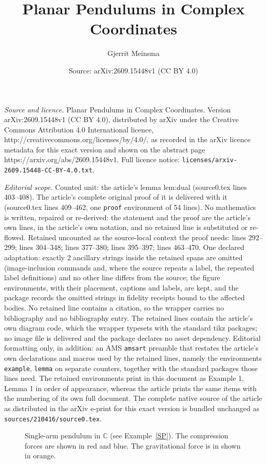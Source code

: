 \documentclass[10pt,a4paper]{amsart}
\title{Planar Pendulums in Complex Coordinates}
\author{Gjerrit Meinsma}
\date{Source: arXiv:2609.15448v1 (CC BY 4.0)}
\newcommand{\mC}{\mathbb{C}}
\begin{document}
\maketitle

\noindent\emph{Source and licence.} Planar Pendulums in Complex Coordinates. Version arXiv:2609.15448v1 (CC BY 4.0), distributed by arXiv under the Creative Commons Attribution 4.0 International licence, http://creativecommons.org/licenses/by/4.0/, as recorded in the arXiv licence metadata for this exact version and shown on the abstract page https://arxiv.org/abs/2609.15448v1. Full licence notice: \texttt{licenses/arxiv-2609.15448-CC-BY-4.0.txt}.\par\smallskip

\noindent\textit{Editorial scope.} Counted unit: the article's lemma lem:dual (source0.tex lines 403--408). The article's complete original proof of it is delivered with it (source0.tex lines 409--462, one \texttt{proof} environment of 54 lines). No mathematics is written, repaired or re-derived: the statement and the proof are the article's own lines, in the article's own notation, and no retained line is substituted or re-flowed.  Retained uncounted as the source-local context the proof needs: lines 292--299; lines 304--348; lines 377--380; lines 395--397; lines 463--470.  One declared adaptation: exactly 2 ancillary strings inside the retained spans are omitted (image-inclusion commands and, where the source repeats a label, the repeated label definitions) and no other line differs from the source; the figure environments, with their placement, captions and labels, are kept, and the package records the omitted strings in fidelity receipts bound to the affected bodies.  No retained line contains a citation, so the wrapper carries no bibliography and no bibliography entry.  The retained lines contain the article's own diagram code, which the wrapper typesets with the standard tikz packages; no image file is delivered and the package declares no asset dependency.  Editorial formatting only, in addition: an AMS \texttt{amsart} preamble that restates the article's own declarations and macros used by the retained lines, namely the environments \texttt{example}, \texttt{lemma} on separate counters, together with the standard packages those lines need.  The retained environments print in this document as Example 1, Lemma 1 in order of appearance, whereas the article prints the same items with the numbering of its own full document.  The complete native source of the article as distributed in the arXiv e-print for this exact version is bundled unchanged as \texttt{sources/210416/source0.tex}.
\begin{figure}[htbp]
  \centering
  
  \caption{Single-arm pendulum in $\mC$ (see 
    Example~\ref{SP}). The compression forces are shown in red and
    blue. The gravitational force is in shown in orange.}
  \label{fig:SDP}
\end{figure}
\end{document}
